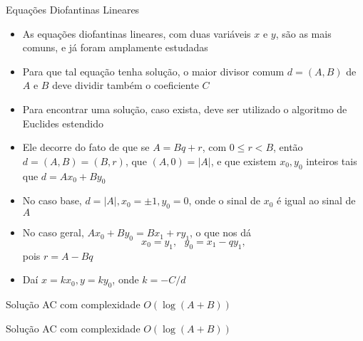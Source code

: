 \begin{frame}[fragile]{Equações Diofantinas Lineares}

    \begin{itemize}

        \item As equações diofantinas lineares, com duas variáveis $x$ e $y$, são as mais comuns,
            e já foram amplamente estudadas
        \pause

        \item Para que tal equação tenha solução, o maior divisor comum $d = (A, B)$ de $A$ e $B$ 
            deve dividir também o coeficiente $C$
        \pause

        \item Para encontrar uma solução, caso exista, deve ser utilizado o algoritmo de
            Euclides estendido
        \pause

        \item Ele decorre do fato de que se $A = Bq + r$, com $0 \leq r < B$, então
            $d = (A, B) = (B, r)$, que $(A, 0) = |A|$, e que existem $x_0, y_0$ inteiros tais que
            $d = Ax_0 + By_0$ 
        \pause

        \item No caso base, $d = |A|, x_0 = \pm 1, y_0 = 0$, onde o sinal de $x_0$ é igual ao
            sinal de $A$
        \pause

        \item No caso geral, $Ax_0 + By_0 = Bx_1 + ry_1$, o que nos dá
        \[
            x_0 = y_1, \, \, \, \, y_0 = x_1 - qy_1,
        \]
        pois $r = A - Bq$
        \pause

        \item Daí $x = kx_0, y = ky_0$, onde $k = -C/d$

    \end{itemize}

\end{frame}

\begin{frame}[fragile]{Solução AC com complexidade $O(\log (A + B))$}
\end{frame}

\begin{frame}[fragile]{Solução AC com complexidade $O(\log (A + B))$}
\end{frame}
